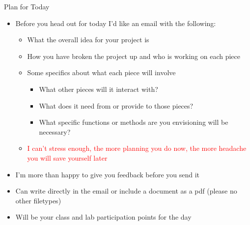 \documentclass[pdf, aspectratio=169, 12pt]{beamer}
\begin{document}
\begin{frame}{Plan for Today}
	\begin{itemize}
		\item Before you head out for today I'd like an email with the following:
			\begin{itemize}
				\item What the overall idea for your project is
				\item How you have broken the project up and who is working on each piece
				\item Some specifics about what each piece will involve
					\begin{itemize}
						\item What other pieces will it interact with?
						\item What does it need from or provide to those pieces?
						\item What specific functions or methods are you envisioning will be necessary?
					\end{itemize}
				\item \textcolor{Red}{I can't stress enough, the more planning you do now, the more headache you will save yourself later}
			\end{itemize}
		\item I'm more than happy to give you feedback before you send it
		\item Can write directly in the email or include a document as a pdf (please no other filetypes)
		\item Will be your class and lab participation points for the day
	\end{itemize}
\end{frame}
\end{document}

